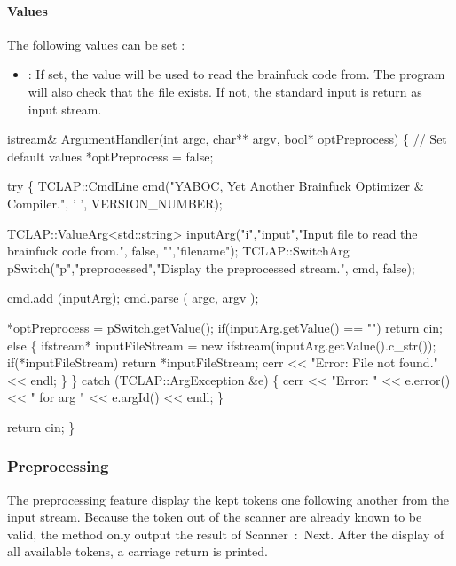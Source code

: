 \paragraph{Values}
The following values can be set :
\begin{itemize}
        \item {} : If set, the value will be used to read the brainfuck code from. The program will also check that the file exists. If not, the standard input is return as input stream.
\end{itemize}

\nwenddocs{}\endmoddef\nwstartdeflinemarkup\nwenddeflinemarkup
istream& ArgumentHandler(int argc, char** argv, bool* optPreprocess) \{
        // Set default values
        *optPreprocess = false;

        try \{
                TCLAP::CmdLine cmd("YABOC, Yet Another Brainfuck Optimizer & Compiler.", ' ', VERSION_NUMBER);

                TCLAP::ValueArg<std::string> inputArg("i","input","Input file to read the brainfuck code from.", false, "","filename");
                TCLAP::SwitchArg pSwitch("p","preprocessed","Display the preprocessed stream.", cmd, false);

                cmd.add (inputArg);
                cmd.parse ( argc, argv );

                *optPreprocess = pSwitch.getValue();
                if(inputArg.getValue() == "") return cin;
                else \{
                        ifstream* inputFileStream = new ifstream(inputArg.getValue().c_str());
                        if(*inputFileStream) return *inputFileStream;
                        cerr << "Error: File not found." << endl;
                \}
        \} catch (TCLAP::ArgException &e) \{
                cerr << "Error: " << e.error() << " for arg " << e.argId() << endl; 
        \}

        return cin;
\}
\nwendcode{}\nwdocspar

\subsubsection{Preprocessing}
The preprocessing feature display the kept tokens one following another from the input stream. Because the token out of the scanner are already known to be valid, the method only output the result of {\Tt{}Scanner\ :\ Next\nwendquote}. After the display of all available tokens, a carriage return is printed.


